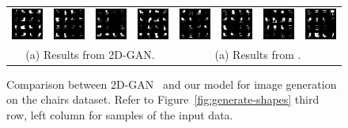 \begin{figure}[t]
\setlength{\tabcolsep}{0pt}
\centering
\begin{tabular}{cccccccc}
\includegraphics[width=.12\linewidth]{fig/comparison/2dgan0.png} &
\includegraphics[width=.12\linewidth]{fig/comparison/2dgan3.png} &
\includegraphics[width=.12\linewidth]{fig/comparison/2dgan5.png} &
\includegraphics[width=.12\linewidth]{fig/comparison/2dgan7.png} \hfill&
\includegraphics[width=.12\linewidth]{fig/comparison/pr2dgan4.png} &
\includegraphics[width=.12\linewidth]{fig/comparison/pr2dgan5.png} &
\includegraphics[width=.12\linewidth]{fig/comparison/pr2dgan6.png} &
\includegraphics[width=.12\linewidth]{fig/comparison/pr2dgan3.png} \\
	\multicolumn{4}{c}{(a) Results from 2D-GAN.} \vspace{4pt} &
	\multicolumn{4}{c}{(a) Results from \prgan.} \vspace{4pt}
\end{tabular}
\caption{\label{fig:validation2} Comparison between 2D-GAN~\cite{goodfellow2014generative} and our \prgan model for image generation on the chairs dataset. Refer to Figure~\ref{fig:generate-shapes} third row, left column for samples of the input data.}
\end{figure}

